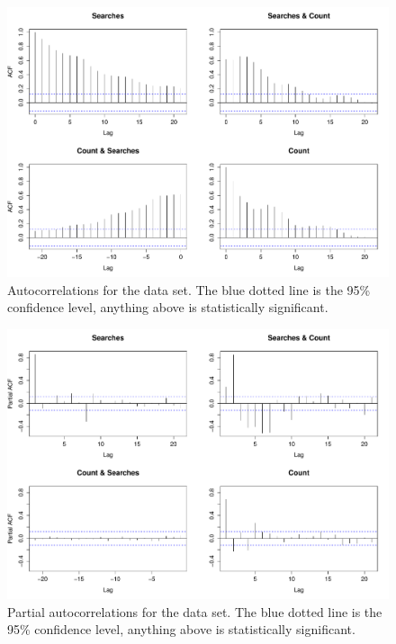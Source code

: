 \documentclass[minf,twoside,singlespacing,parskip,frontabs,notimes,12pt]{infthesis} %
\begin{document}
\begin{figure}[]
\begin{center}
\includegraphics[width=\textwidth]{autocorrelation}
\end{center}
\caption{Autocorrelations for the data set. The blue dotted line is the 95\% confidence level, anything above is statistically significant.}
\label{autocor}
\end{figure}

\begin{figure}[]
\begin{center}
\includegraphics[width=\textwidth]{partial_autocorellation}
\end{center}
\caption{Partial autocorrelations for the data set. The blue dotted line is the 95\% confidence level, anything above is statistically significant.}
\label{megacor}
\end{figure}
\end{document}
